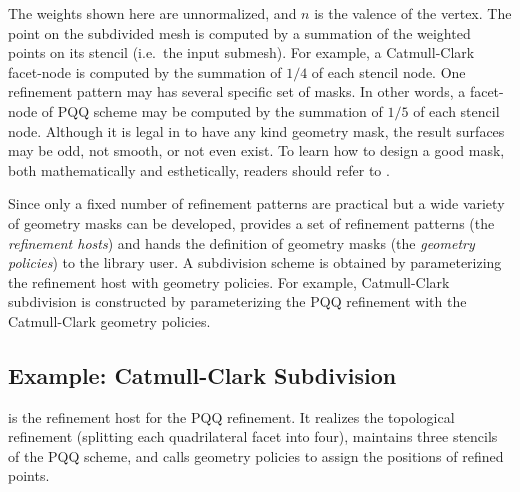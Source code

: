
The weights shown here are unnormalized, and $n$ is the valence 
of the vertex. 
The point on the subdivided mesh is computed by a summation
of the weighted points on its stencil (i.e.~the input submesh).
For example, a Catmull-Clark facet-node is computed by the summation
of $1/4$ of each stencil node. 
One refinement pattern may has several specific set of masks. In other 
words, a facet-node of PQQ scheme may be computed by the summation
of $1/5$ of each stencil node. Although it is legal in 
 to have any kind geometry mask,
the result surfaces may be odd, not smooth, or not even exist.
To learn how to design a good mask, both mathematically and esthetically, 
readers should refer to \cite{cgal:ww-smgd-02}.


Since only a fixed number of refinement patterns are 
practical but a wide variety of geometry masks can be developed,
 provides a set of refinement patterns 
(the \emph{refinement hosts})
and hands the definition of geometry masks
(the \emph{geometry policies}) to the library user.
A subdivision scheme is obtained by parameterizing the 
refinement host with geometry policies. 
For example, Catmull-Clark subdivision is constructed by 
parameterizing the PQQ refinement with the Catmull-Clark geometry 
policies.



\subsection{Example: Catmull-Clark Subdivision}
 is the refinement 
host for the PQQ refinement. It realizes the topological 
refinement (splitting each quadrilateral facet into four), 
maintains three stencils of the 
PQQ scheme, and calls geometry policies to assign the positions
of refined points.

